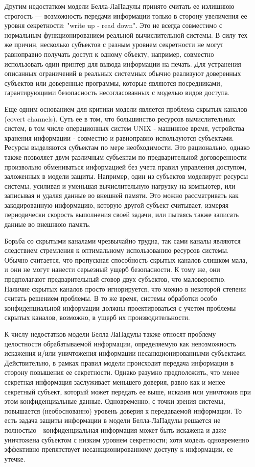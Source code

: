 Другим недостатком модели Белла-ЛаПадулы принято считать ее излишнюю строгость --- возможность передачи информации только в сторону увеличения ее уровня секретности: "write up - read down". Это не всегда совместимо с нормальным функционированием реальной вычислительной системы. В силу тех же причин, несколько субъектов с разным уровнем секретности не могут равноправно получать доступ к одному объекту, например, совместно использовать один принтер для вывода информации на печать. Для устранения описанных ограничений в реальных системных обычно реализуют доверенных субъектов или доверенные программы, которые являются посредниками, гарантирующими безопасность несогласованных с моделью видов доступа.

Еще одним основанием для критики модели является проблема скрытых каналов (covert channels). Суть ее в том, что большинство ресурсов вычислительных систем, в том числе операционных систем UNIX - машинное время, устройства хранения информации - совместно и равноправно используются субъектами. Ресурсы выделяются субъектам по мере необходимости. Это рационально, однако также позволяет двум различным субъектам по предварительной договоренности произвольно обмениваться информацией без учета правил управления доступом, заложенных в модели защиты. Например, один из субъектов моделирует ресурсы системы, усиливая и уменьшая вычислительную нагрузку на компьютер, или записывая и удаляя данные во внешней памяти. Это можно рассматривать как закодированную информацию, которую другой субъект считывает, измеряя периодически скорость выполнения своей задачи, или пытаясь также записать данные во внешнюю память.

Борьба со скрытыми каналами чрезвычайно трудна, так сами каналы являются следствием стремления к оптимальному использованию ресурсов системы. Обычно считается, что пропускная способность скрытых каналов слишком мала, и они не могут нанести серьезный ущерб безопасности. К тому же, они предполагают предварительный сговор двух субъектов, что маловероятно. Наличие скрытых каналов просто игнорируется, что можно в некоторой степени считать решением проблемы. В то же время, системы обработки особо конфиденциальной информации должны проектироваться с учетом проблемы скрытых каналов, возможно, в ущерб их производительности.

К числу недостатков модели Белла-ЛаПадулы также относят проблему целостности обрабатываемой информации, определяемую как невозможность искажения и/или уничтожения информации несанкционированными субъектами. Действительно, в рамках правил модели происходит передача информации в сторону повышения ее секретности. Однако разумно предположить, что менее секретная информация заслуживает меньшего доверия, равно как и менее секретный субъект, который может передать ее выше, исказив или уничтожив при этом конфиденциальные данные. Одновременно, с точки зрения системы, повышается (необоснованно) уровень доверия к передаваемой информации. То есть задача защиты информации в модели Белла-ЛаПадулы решается не полностью - конфиденциальная информация может быть искажена и даже уничтожена субъектом с низким уровнем секретности; хотя модель одновременно эффективно препятствует несанкционированному доступу к информации, ее утечке.

